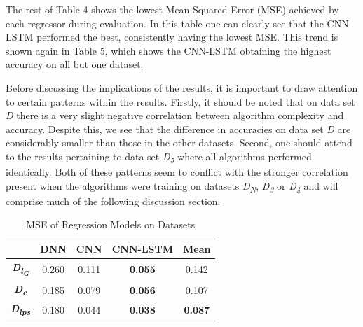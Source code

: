 \documentclass[letterpaper, 10 pt, conference]{ieeeconf}  %
\begin{document}
    The rest of Table 4 shows the lowest Mean Squared Error (MSE) achieved by each regressor during evaluation. In this table one can clearly see that the CNN-LSTM performed the best, consistently having the lowest MSE. This trend is shown again in Table 5, which shows the CNN-LSTM obtaining the highest accuracy on all but one dataset. 
	
    Before discussing the implications of the results, it is important to draw attention to certain patterns within the results. Firstly, it should be noted that on data set \textit{D} there is a very slight negative correlation between algorithm complexity and accuracy. Despite this, we see that the difference in accuracies on data set \textit{D} are considerably smaller than those in the other datasets. Second, one should attend to the results pertaining to data set \textit{D\textsubscript{5}} where all algorithms performed identically. Both of these patterns seem to conflict with the stronger correlation present when the algorithms were training on datasets \textit{D\textsubscript{N}}, \textit{D\textsubscript{3}} or \textit{D\textsubscript{4}} and will comprise much of the following discussion section. 
    
\begin{table}
\caption{MSE of Regression Models on Datasets}
\setlength{\tabcolsep}{5mm} %
\def\arraystretch{1.25} %
\centering

  \begin{tabular}{|c|c|c|c||c|}
	\hline
    & \textbf{DNN} & \textbf{CNN} & \textbf{CNN-LSTM} & \textbf{Mean}\\ \hline
    \textbf{\textit{D\textsubscript{l\textsubscript{G}}}} & 0.260	& 0.111 & \textbf{0.055} & 0.142\\ \hline
    \textbf{\textit{D\textsubscript{c}}} & 0.185	& 0.079 & \textbf{0.056} & 0.107 \\ \hline
    \textbf{\textit{D\textsubscript{lps}}} & 0.180 & 0.044 & \textbf{0.038} & \textbf{0.087} \\ \hline
  \end{tabular}
\end{table}
\end{document}
